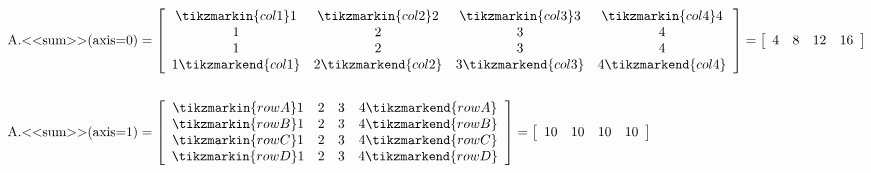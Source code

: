 \begin{align*}
\text{\li{A.<<sum>>(axis=0)}} &= %
\left[\begin{array}{cccc}
\tikzmarkin{col1}1 & \tikzmarkin{col2}2 & \tikzmarkin{col3}3 & \tikzmarkin{col4}4\\
1 & 2 & 3 & 4\\
1 & 2 & 3 & 4\\
1\tikzmarkend{col1} & 2\tikzmarkend{col2} & 3\tikzmarkend{col3} & 4\tikzmarkend{col4}
\end{array}\right]
= \left[\begin{array}{cccc} 4 & 8 & 12 & 16 \end{array}\right]
\\ \\
\text{\li{A.<<sum>>(axis=1)}} &= %
\left[\begin{array}{cccc}
\tikzmarkin{rowA}1 & 2 & 3 & 4\tikzmarkend{rowA}\\
\tikzmarkin{rowB}1 & 2 & 3 & 4\tikzmarkend{rowB}\\
\tikzmarkin{rowC}1 & 2 & 3 & 4\tikzmarkend{rowC}\\
\tikzmarkin{rowD}1 & 2 & 3 & 4\tikzmarkend{rowD}\\
\end{array}\right]
= \left[\begin{array}{cccc} 10 & 10 & 10 & 10 \end{array}\right]
\end{align*}
